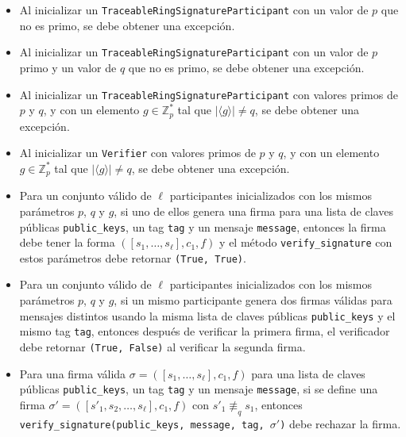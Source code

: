\begin{itemize}
\item \text{[0.25 puntos]} Al inicializar un \texttt{TraceableRingSignatureParticipant} con un valor de $p$ que no es primo, se debe obtener una excepción.

\item \text{[0.25 puntos]} Al inicializar un \texttt{TraceableRingSignatureParticipant} con un valor de $p$ primo y un valor de $q$ que no es primo, se debe obtener una excepción.

\item \text{[0.25 puntos]} Al inicializar un \texttt{TraceableRingSignatureParticipant} con valores primos de $p$ y $q$, y con un elemento $g \in \mathbb{Z}_p^*$ tal que $|\langle g \rangle| \neq q$, se debe obtener una excepción.

\item \text{[0.25 puntos]} Al inicializar un \texttt{Verifier} con valores primos de $p$ y $q$, y con un elemento $g \in \mathbb{Z}_p^*$ tal que $|\langle g \rangle| \neq q$, se debe obtener una excepción.

\item \text{[0.5 puntos]} Para un conjunto válido de $\ell$ participantes inicializados con los mismos parámetros $p$, $q$ y $g$, si uno de ellos genera una firma para una lista de claves públicas \texttt{public\_keys}, un tag \texttt{tag} y un mensaje \texttt{message}, entonces la firma debe tener la forma $([s_1,\ldots,s_\ell], c_1, f)$ y el método \texttt{verify\_signature} con estos parámetros debe retornar \texttt{(True, True)}.


\item \text{[0.25 puntos]} Para un conjunto válido de $\ell$ participantes inicializados con los mismos parámetros $p$, $q$ y $g$, si un mismo participante genera dos firmas válidas para mensajes distintos usando la misma lista de claves públicas \texttt{public\_keys} y el mismo tag \texttt{tag}, entonces después de verificar la primera firma, el verificador debe retornar \texttt{(True, False)} al verificar la segunda firma.

\item \text{[0.25 puntos]} Para una firma válida $\sigma = ([s_1,\ldots,s_\ell], c_1, f)$ para una lista de claves públicas \texttt{public\_keys}, un tag \texttt{tag} y un mensaje \texttt{message}, si se define una firma $\sigma' = ([s'_1,s_2,\ldots,s_\ell], c_1, f)$ con $s'_1 \not\equiv_q s_1$, entonces \texttt{verify\_signature(public\_keys, message, tag, $\sigma'$)} debe rechazar la firma.
\end{itemize}
